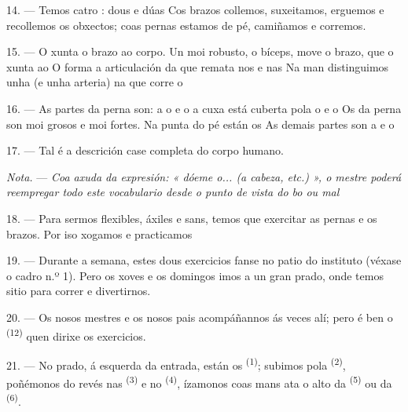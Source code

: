 \VUsaut{4.4mm}
\VUsaut{3.0mm}

14. --- Temos catro : dous  e dúas 
Cos brazos collemos, suxeitamos, erguemos e recollemos os obxectos; coas pernas estamos de
pé, camiñamos e corremos.

15. --- O  xunta o brazo ao corpo. Un  moi robusto,
o bíceps, move o brazo, que o  xunta ao  O
 forma a articulación da  que remata nos  e
nas  Na man distinguimos unha  (e unha arteria) na que corre
o 

16. --- As partes da perna son: a  o  e o
 a  cuxa  está cuberta pola
 o  e o  Os  da perna son moi
grosos e moi fortes. Na punta do pé están os  As demais partes
son a  e o 

17. --- Tal é a descrición case completa do corpo humano.

\textit{Nota.} --- \textit{Coa axuda da expresión: « dóeme o... (a cabeza, etc.) », o
mestre poderá reempregar todo este vocabulario desde o punto de vista do bo ou mal}

\VUsaut{5.0mm}
\VUsaut{2.4mm}
\VUsaut{3.0mm}

18. --- Para sermos flexibles, áxiles e sans, temos que exercitar as pernas e os
brazos. Por iso xogamos e practicamos 

19. --- Durante a semana, estes dous exercicios fanse no patio do instituto (véxase o
cadro n.º 1). Pero os xoves e os domingos imos a un gran prado, onde temos sitio para
correr e divertirnos.

20. --- Os nosos mestres e os nosos pais acompáñannos ás veces alí; pero é ben o
 \textsuperscript{(12)} quen dirixe os exercicios.

21. --- No prado, á esquerda da entrada, están os 
\textsuperscript{(1)}; subimos pola  \textsuperscript{(2)}, poñémonos
do revés nas  \textsuperscript{(3)} e no 
\textsuperscript{(4)}, ízamonos coas mans ata o alto da 
\textsuperscript{(5)} ou da  \textsuperscript{(6)}.


